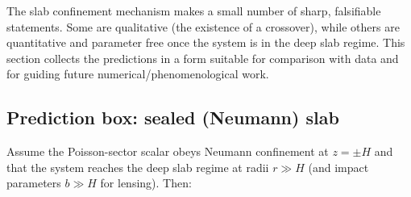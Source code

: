 \documentclass[11pt]{article}
\begin{document}
The slab confinement mechanism makes a small number of sharp, falsifiable statements.
Some are qualitative (the existence of a crossover), while others are quantitative and parameter
free once the system is in the deep slab regime.
This section collects the predictions in a form suitable for comparison with data and for guiding
future numerical/phenomenological work.

\subsection{Prediction box: sealed (Neumann) slab}
\label{sec:tests_prediction_box}

Assume the Poisson-sector scalar obeys Neumann confinement at $z=\pm H$ and that the system reaches
the deep slab regime at radii $r\gg H$ (and impact parameters $b\gg H$ for lensing).  Then:
\end{document}
